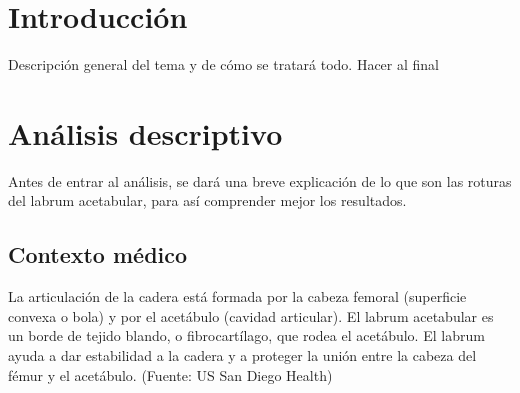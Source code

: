 \documentclass[11pt]{book}
\newcommand{\forceindent}{\leavevmode{\parindent=2em\indent}} %
\begin{document}
	\chapter{Introducción}  %
	\doublespacing 
	Descripción general del tema y de cómo se tratará todo. Hacer al final


	\chapter{Análisis descriptivo}  %
	\doublespacing 
			
			
			\forceindent Antes de entrar al análisis, se dará una breve explicación de lo que son las roturas del labrum acetabular, para así comprender mejor los resultados.
			
	        \section{Contexto médico}
	        \forceindent La articulación de la cadera está formada por la cabeza femoral (superficie convexa o bola) y por el acetábulo (cavidad articular). El labrum acetabular es un borde de tejido blando, o fibrocartílago, que rodea el acetábulo. El labrum ayuda a dar estabilidad a la cadera y a proteger la unión entre la cabeza del fémur y el acetábulo. (Fuente: US San Diego Health) 
	        
\end{document}
